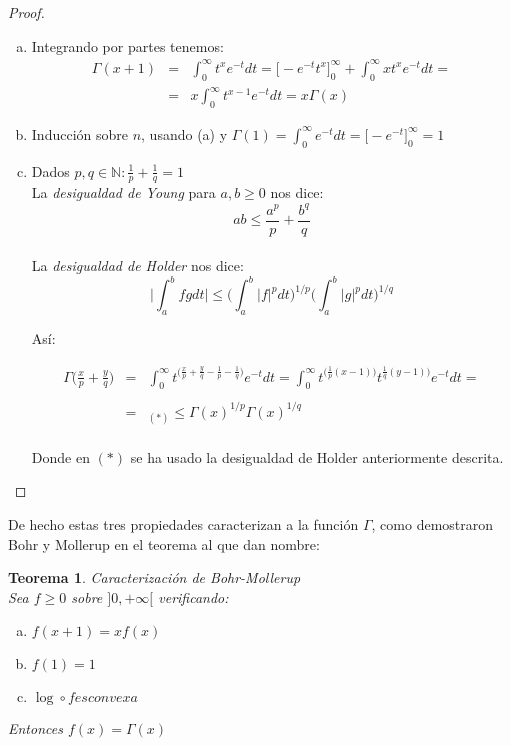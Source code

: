 \documentclass[a4paper, 11pt]{amsart}
\newtheorem{theorem}{Teorema}[section]
\theoremstyle{definition}
\theoremstyle{remark}
\numberwithin{equation}{section}
\begin{document}
   \begin{proof}

     \begin{enumerate}[(a)]
      \item Integrando por partes tenemos:
	\begin{eqnarray*}
	\Gamma(x+1) &=& \int_0^{\infty}{t^{x}e^{-t}dt} = \bigg[-e^{-t}t^x\bigg]_0^{\infty} +
	  \int_0^{\infty}{xt^xe^{-t}dt} = \\
	  & = & x\int_0^{\infty}{t^{x-1}e^{-t}dt} = x\Gamma(x)
	\end{eqnarray*}
      \item Inducción sobre $n$, usando (a) y $\Gamma(1) = \int_0^{\infty}{e^{-t}dt} = 
	\bigg[-e^{-t}\bigg]_0^{\infty} = 1 $
      \item Dados $p,q \in \mathbb{N} : \frac{1}{p} + \frac{1}{q} = 1$\\
      
	La \textit{desigualdad de Young} para $a,b \ge 0$ nos dice: 
	  $$ab \le \frac{a^p}{p} + \frac{b^q}{q}$$\\
	La \textit{desigualdad de Holder} nos dice: 
	  $$\bigg|\int_a^b {fg dt}\bigg| \le 
	  \bigg(\int_a^b {|f|^p dt}\bigg)^{1/p} \bigg(\int_a^b {|g|^p dt}\bigg)^{1/q}$$
	  
	Así:
	
	\begin{eqnarray*}
	 \Gamma\bigg(\frac{x}{p} +\frac{y}{q}\bigg) & = & 
	    \int_0^{\infty}{t^{\big(\frac{x}{p}+\frac{y}{q}
	    -\frac{1}{p}-\frac{1}{q}\big)}e^{-t}dt} 
	    =\int_0^{\infty}{t^{\big(\frac{1}{p}(x-1)\big)} t^{\frac{1}{q}(y-1)\big)}e^{-t}dt} =\\
	    \\
	 & = &_{(*)} \le \Gamma(x)^{1/p}\Gamma(x)^{1/q}
	\end{eqnarray*}\\
	
	Donde en $(*)$ se ha usado la desigualdad de Holder anteriormente descrita.

     \end{enumerate}
      
    \end{proof}
  
  De hecho estas tres propiedades caracterizan a la función $\Gamma$, como demostraron Bohr y
  Mollerup en el teorema al que dan nombre:
      
  \begin{theorem}{Caracterización de Bohr-Mollerup}\\
  
  Sea $f\ge 0$ sobre $]0,+\infty[$ verificando:
  
  \begin{enumerate}[(a)]
   \item $f(x+1) = xf(x)$
   \item $f(1) = 1$
   \item $\log \circ f es convexa$
  \end{enumerate}
  
   Entonces $f(x) = \Gamma(x)$
  \label{caracterizacion}
  \end{theorem}
\end{document}
